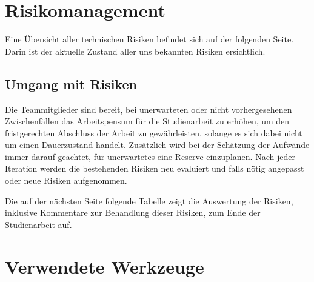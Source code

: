 \documentclass[12pt, a4paper]{report}
\begin{document}
	
	
	\chapter{Risikomanagement}
	Eine Übersicht aller technischen Risiken befindet sich auf der folgenden Seite. Darin ist der aktuelle Zustand aller uns bekannten Risiken ersichtlich.
	
	\section{Umgang mit Risiken}
	Die Teammitglieder sind bereit, bei unerwarteten oder nicht vorhergesehenen Zwischenfällen das Arbeitspensum für die Studienarbeit zu erhöhen, um den fristgerechten Abschluss der Arbeit zu gewährleisten, solange es sich dabei nicht um einen Dauerzustand handelt. Zusätzlich wird bei der Schätzung der Aufwände immer darauf geachtet, für unerwartetes eine Reserve einzuplanen.
	Nach jeder Iteration werden die bestehenden Risiken neu evaluiert und falls nötig angepasst oder neue Risiken aufgenommen.
	
	Die auf der nächsten Seite folgende Tabelle zeigt die Auswertung der Risiken, inklusive Kommentare zur Behandlung dieser Risiken, zum Ende der Studienarbeit auf.
	
	 

	\chapter{Verwendete Werkzeuge}
	\label{chap:werkzeuge}
	
	
	
\end{document}

